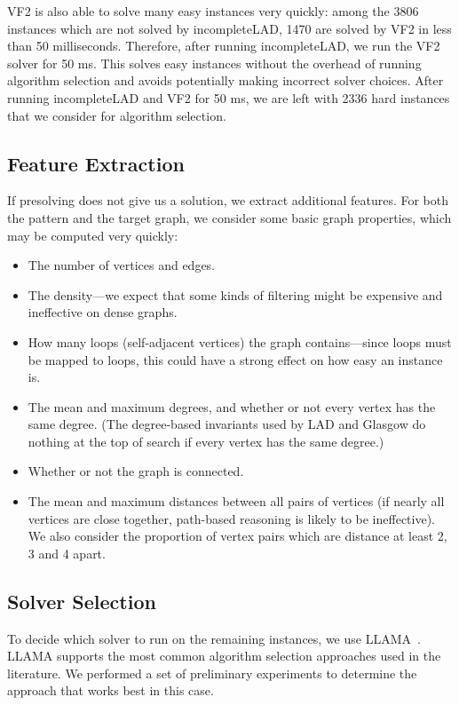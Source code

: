 \documentclass{llncs}
\begin{document}
VF2 is also able to solve many easy instances very quickly: among the 3806 instances which are not
solved by incompleteLAD, 1470 are solved by VF2 in less than 50 milliseconds. Therefore, after
running incompleteLAD, we run the VF2 solver for 50 ms. This solves easy instances without the
overhead of running algorithm selection and avoids potentially making incorrect solver choices.
After running incompleteLAD and VF2 for 50 ms, we are left with 2336 hard instances that we consider
for algorithm selection.

\subsection{Feature Extraction}

If presolving does not give us a solution, we extract additional features. For both the pattern and
the target graph, we consider some basic graph properties, which may be computed very quickly:

\begin{itemize}
    \item The number of vertices and edges.
    \item The density---we expect that some kinds of filtering might be expensive and ineffective on
        dense graphs.
    \item How many loops (self-adjacent vertices) the graph contains---since loops must be mapped to
        loops, this could have a strong effect on how easy an instance is.
    \item The mean and maximum degrees, and whether or not every vertex has the same degree. (The
        degree-based invariants used by LAD and Glasgow do nothing at the top of search if every
        vertex has the same degree.)
    \item Whether or not the graph is connected.
    \item The mean and maximum distances between all pairs of vertices (if nearly all vertices are
        close together, path-based reasoning is likely to be ineffective). We also consider the
        proportion of vertex pairs which are distance at least 2, 3 and 4 apart.
\end{itemize}

\subsection{Solver Selection}

To decide which solver to run on the remaining instances, we use
LLAMA~\cite{kotthoff_llama_2013}. LLAMA supports the most common algorithm
selection approaches used in the literature. We performed a set of preliminary
experiments to determine the approach that works best in this case.
\end{document}
